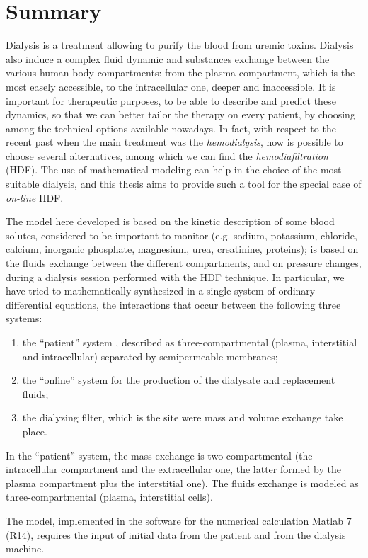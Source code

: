\chapter*{Summary}
Dialysis is a treatment allowing to purify the blood from uremic toxins. Dialysis also induce a complex fluid dynamic and substances exchange between the various human body compartments: from the plasma compartment, which is the most easely accessible, to the intracellular one, deeper and inaccessible. It is important for therapeutic purposes, to be able to describe and predict these dynamics, so that we can better tailor the therapy on every patient, by choosing among the technical options available nowadays. In fact, with respect to the recent past when the main treatment was the \textit{hemodialysis}, now is possible to choose several alternatives, among which we can find the \textit{hemodiafiltration} (HDF).
The use of mathematical modeling can help in the choice of the most suitable dialysis, and this thesis aims to provide such a tool for the special case of \textit{on-line} HDF.

The model here developed is based on the kinetic description of some blood solutes, considered to be important to monitor (e.g. sodium, potassium, chloride, calcium, inorganic phosphate, magnesium, urea, creatinine, proteins); is based on the fluids exchange between the different compartments, and on pressure changes, during a dialysis session performed with the HDF technique. In particular, we have tried to mathematically synthesized in a single system of ordinary differential equations, the interactions that occur between the following three systems:
\begin{enumerate}
	\item the ``patient'' system , described as three-compartmental (plasma, interstitial and intracellular) separated by semipermeable membranes;
	\item the ``online'' system for the production of the dialysate and replacement fluids;
	\item the  dialyzing filter, which is the site were mass and volume exchange take place.
\end{enumerate}
In the ``patient'' system, the mass exchange is two-compartmental (the intracellular compartment and the extracellular one, the latter formed by the plasma compartment plus the interstitial one). The fluids exchange is modeled as three-compartmental (plasma, interstitial cells).

The model, implemented in the software for the numerical calculation Matlab\textsuperscript\textregistered{} 7 (R14), requires the input of initial data from the patient and from the dialysis machine.

